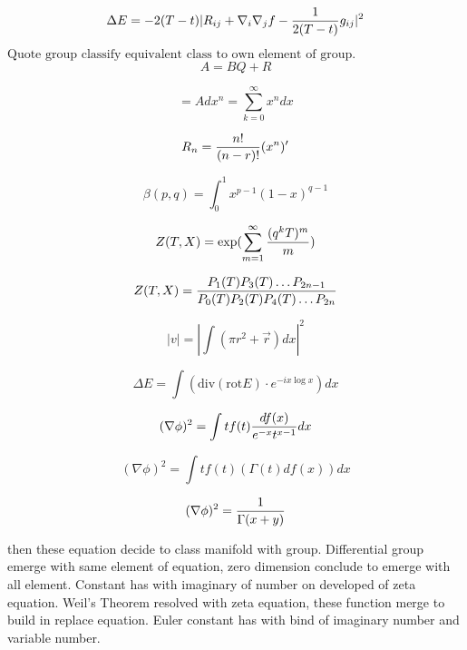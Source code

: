 \documentclass{jsarticle}
\begin{document}
\begin{equation}
 \Delta E = - 2(T- t)|R_{ij} + \nabla_{i} \nabla_{j} f - 
	{1 \over 2(T - t)}g_{ij}|^2
\end{equation}
$\text{Quote group classify equivalent class to own element of group.}$
\begin{equation}
   A = BQ + R 
\end{equation}

\begin{equation}
   [x] = A 
  dx^n = \sum^\infty_{k=0} x^n dx 
\end{equation}

\begin{equation}
   R_{n} = {n! \over (n - r)!} (x^n)' 
\end{equation}

\begin{equation}
   \beta (p,q) = \int^1_0 x^{p-1} (1 - x)^{q-1} 
\end{equation}

\begin{equation}
   Z(T,X) = \mathrm{exp} (\sum^\infty_{m=1}{(q^k T)^m \over m}) 
\end{equation}

\begin{equation}
   Z(T,X) = {P_{1}(T) P_{3}(T) \dots P_{2n-1} \over  
	P_{0}(T) P_{2}(T) P_{4}(T) \dots P_{2n}} 
\end{equation}

\begin{equation}
   |v| = |\int (\pi r^2 + \vec{r})dx|^2 
\end{equation}

\begin{equation}
   \Delta E = \int (\mathrm{div} (\mathrm{rot} E) \cdot e^{-ix \log x}) dx 
\end{equation}


\begin{equation}
   (\nabla \phi)^2 = \int tf(t){df(x) \over e^{-x} t^{x - 1}} dx 
\end{equation}

\begin{equation}
   (\nabla \phi)^2 = \int tf(t)(\Gamma(t)df(x)) dx 
\end{equation}

\begin{equation}
   (\nabla \phi)^2 = {1 \over \Gamma(x + y)} 
\end{equation}

   then these equation decide to class manifold with group.
  Differential group emerge with same element of equation, zero dimension conclude to emerge with all element.
  Constant has with imaginary of number on developed of zeta equation. Weil's Theorem resolved with zeta equation,
these function merge to build in replace equation. Euler constant has with bind of imaginary number and variable 
number.
\end{document}
